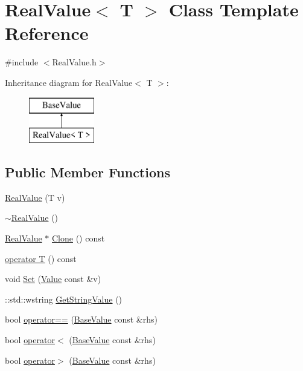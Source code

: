 \hypertarget{class_real_value}{}\section{Real\+Value$<$ T $>$ Class Template Reference}
\label{class_real_value}


{\ttfamily \#include $<$Real\+Value.\+h$>$}

Inheritance diagram for Real\+Value$<$ T $>$\+:\begin{figure}[H]
\begin{center}
\leavevmode
\includegraphics[height=2.000000cm]{class_real_value}
\end{center}
\end{figure}
\subsection*{Public Member Functions}
\begin{DoxyCompactItemize}
\item 
\hyperlink{class_real_value_a9d4eb739987c82fa410a08a2fb5d3859}{Real\+Value} (T v)
\item 
\hyperlink{class_real_value_ad572273548dfb4f19fab98e9aa799506}{$\sim$\+Real\+Value} ()
\item 
\hyperlink{class_real_value}{Real\+Value} $\ast$ \hyperlink{class_real_value_a317bb56ff1e3a5bbd7529bd989427cdd}{Clone} () const 
\item 
\hyperlink{class_real_value_a208400566495560d4d170c0aedabcc02}{operator T} () const 
\item 
void \hyperlink{class_real_value_a466b4ab4a6c0efd3f50c110d01ec3bb9}{Set} (\hyperlink{class_value}{Value} const \&v)
\item 
\+::std\+::wstring \hyperlink{class_real_value_accec9306189b55fec0c6e968027620f9}{Get\+String\+Value} ()
\item 
bool \hyperlink{class_real_value_ac4484e45f8b09f6dde6adabefb839691}{operator==} (\hyperlink{class_base_value}{Base\+Value} const \&rhs)
\item 
bool \hyperlink{class_real_value_a2c63ece61830351b9d1f953f61cf9a75}{operator$<$} (\hyperlink{class_base_value}{Base\+Value} const \&rhs)
\item 
bool \hyperlink{class_real_value_a9d360c889a310f11c7e302c6c4b32011}{operator$>$} (\hyperlink{class_base_value}{Base\+Value} const \&rhs)
\end{DoxyCompactItemize}
